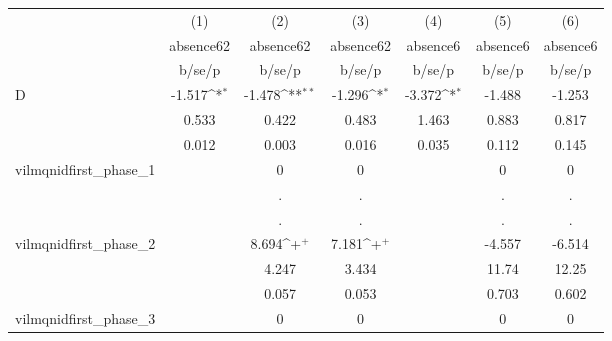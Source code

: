 {
\def\sym#1{\ifmmode^{#1}\else\(^{#1}\)\fi}
\begin{tabular}{l*{6}{c}}
\hline\hline
            &\multicolumn{1}{c}{(1)}&\multicolumn{1}{c}{(2)}&\multicolumn{1}{c}{(3)}&\multicolumn{1}{c}{(4)}&\multicolumn{1}{c}{(5)}&\multicolumn{1}{c}{(6)}\\
            &\multicolumn{1}{c}{absence62}&\multicolumn{1}{c}{absence62}&\multicolumn{1}{c}{absence62}&\multicolumn{1}{c}{absence6}&\multicolumn{1}{c}{absence6}&\multicolumn{1}{c}{absence6}\\
            &      b/se/p         &      b/se/p         &      b/se/p         &      b/se/p         &      b/se/p         &      b/se/p         \\
\hline
D           &      -1.517\sym{*}  &      -1.478\sym{**} &      -1.296\sym{*}  &      -3.372\sym{*}  &      -1.488         &      -1.253         \\
            &       0.533         &       0.422         &       0.483         &       1.463         &       0.883         &       0.817         \\
            &       0.012         &       0.003         &       0.016         &       0.035         &       0.112         &       0.145         \\
vilmqnidfirst\_phase\_1&                     &           0         &           0         &                     &           0         &           0         \\
            &                     &           .         &           .         &                     &           .         &           .         \\
            &                     &           .         &           .         &                     &           .         &           .         \\
vilmqnidfirst\_phase\_2&                     &       8.694\sym{+}  &       7.181\sym{+}  &                     &      -4.557         &      -6.514         \\
            &                     &       4.247         &       3.434         &                     &       11.74         &       12.25         \\
            &                     &       0.057         &       0.053         &                     &       0.703         &       0.602         \\
vilmqnidfirst\_phase\_3&                     &           0         &           0         &                     &           0         &           0         \\

\end{tabular}}
